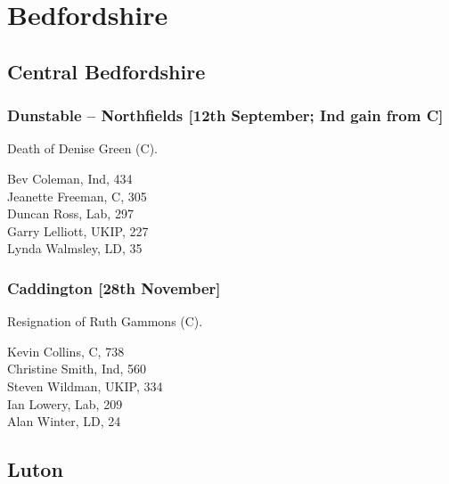 \documentclass[a4paper,openany,10pt]{book}
\begin{document}
\vfill

\section{Bedfordshire}

\subsection*{Central Bedfordshire}

\subsubsection*{Dunstable -- Northfields \hspace*{\fill}\nolinebreak[1]%
\enspace\hspace*{\fill}
[12th September; Ind gain from C]}


Death of Denise Green (C).



Bev Coleman, Ind, 434\\
Jeanette Freeman, C, 305\\
Duncan Ross, Lab, 297\\
Garry Lelliott, UKIP, 227\\
Lynda Walmsley, LD, 35\\


\subsubsection*{Caddington \hspace*{\fill}\nolinebreak[1]%
\enspace\hspace*{\fill}
[28th November]}


Resignation of Ruth Gammons (C).



Kevin Collins, C, 738\\
Christine Smith, Ind, 560\\
Steven Wildman, UKIP, 334\\
Ian Lowery, Lab, 209\\
Alan Winter, LD, 24\\


\subsection*{Luton}
\end{document}
